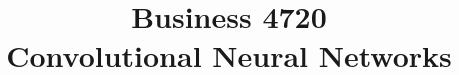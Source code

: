 \documentclass{article}
\title{Business 4720\\ \vspace{\baselineskip}
Convolutional Neural Networks}
\begin{document}
\maketitle

\vfill

\clearpage


\end{document}
